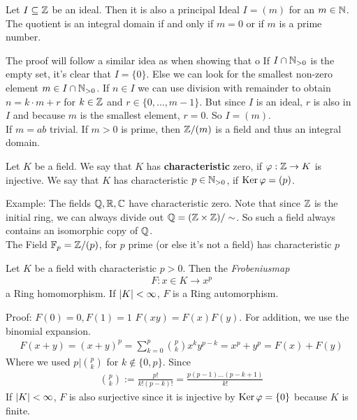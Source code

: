 \begin{lemma}[]
	Let $I \subseteq \mathbb{Z}$ be an ideal. Then it is also a principal Ideal $I = (m)$ for an $m \in \mathbb{N}$. The quotient is an integral domain if and only if $m = 0$ or if $m$ is a prime number.
\end{lemma}
The proof will follow a similar idea as when showing that o
If $I \cap \mathbb{N}_{> 0}$ is the empty set, it's clear that $I = \{0\}$. Else we can look for the smallest non-zero element $m \in I \cap \mathbb{N}_{> 0}$. If $n \in I$ we can use division with remainder to obtain $n = k \cdot m + r$ for $k \in \mathbb{Z}$ and $r \in \{0, \ldots, m-1\}$. But since $I$ is an ideal, $r$ is also in $I$ and because $m$ is the smallest element, $r = 0$. So $I = (m)$.\\
If $m = ab$ trivial. If $m > 0$ is prime, then $\mathbb{Z}/(m)$ is a field and thus an integral domain.\\


\begin{definition}[Characteristic]
	Let $K$ be a field. We say that $K$ has \textbf{characteristic} zero, if $\varphi: \mathbb{Z} \to K$ is injective. We say that $K$ has characteristic $p \in \mathbb{N}_{>0}$, if $\operatorname{Ker} \varphi = (p)$.
\end{definition}

Example: The fields $\mathbb{Q},\mathbb{R},\mathbb{C}$ have characteristic zero. Note that since $\mathbb{Z}$ is the initial ring, we can always divide out $\mathbb{Q} = (\mathbb{Z} \times \mathbb{Z})/\sim$. So such a field always contains an isomorphic copy of $\mathbb{Q}$.\\
The Field $\mathbb{F}_p = \mathbb{Z}/(p)$, for $p$ prime (or else it's not a field) has characteristic $p$\\


\begin{proposition}[]
	Let $K$ be a field with characteristic $p > 0$. Then the \emph{Frobeniusmap}
	\begin{align*}
		F: x \in K \to x^{p}
	\end{align*}
	a Ring homomorphism. If $\vert K\vert < \infty$, $F$ is a Ring automorphism.
\end{proposition}

Proof: $F(0) = 0, F(1) = 1$ $F(xy) = F(x) F(y)$. For addition, we use the binomial expansion.
\begin{align*}
	F(x+y) = (x + y)^p = \sum_{k=0}^{p} \binom{p}{k}x^k y^{p-k} = x^p + y^p = F(x) + F(y)
\end{align*}
Where we used $p | \binom{p}{k}$ for $k \notin \{0,p\}$. Since
\begin{align*}
	\binom{p}{k} := \frac{p!}{k!(p-k)!} = \frac{p(p-1) \dots (p-k+1)}{k!}
\end{align*}
If $\vert K\vert < \infty$, $F$ is also surjective since it is injective by $\operatorname{Ker} \varphi = \{0\}$ because $K$ is finite. 
